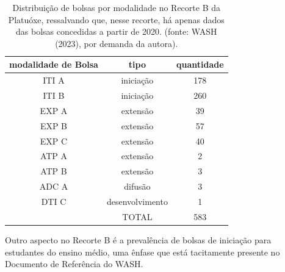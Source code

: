 \noindent\begin{center}\mbox{\centering{}}\end{center}






\begin{table}[htb]
\tiny
\caption{\label{8869e5a84c342de33f5dd045c633ba43f41c955f}Distribuição de bolsas por modalidade no Recorte B da Platuóxe, ressalvando que, nesse recorte, há apenas dados das bolsas concedidas a partir de 2020. (fonte:  WASH (2023), por demanda da autora).}

\centering
\begin{tabular}{|c|c|c|}
\hline
modalidade de Bolsa  &  tipo  &  quantidade \\
\hline
ITI A  &  iniciação  &  178 \\
ITI B  &  iniciação  &  260 \\
EXP A  &  extensão  &  39 \\
EXP B  &  extensão  &  57 \\
EXP C  &  extensão  &  40 \\
ATP A  &  extensão  &  2 \\
ATP B  &  extensão  &  3 \\
ADC A  &  difusão  &  3 \\
DTI C  &  desenvolvimento  &  1 \\
\hline
  &  TOTAL  &  583 \\
\hline
\end{tabular}
\end{table}


Outro aspecto no Recorte B é a prevalência de bolsas de iniciação para estudantes do ensino médio, uma ênfase que está tacitamente presente no Documento de Referência do WASH.


\noindent\begin{center}\mbox{\centering{}}\end{center}


